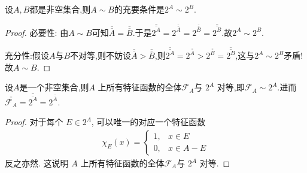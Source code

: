 \documentclass[../../main.tex]{subfiles}%
\begin{document}
\begin{proposition}\label{proposition:两集合对等的充要条件是幂集也对等}
设$A,B$都是非空集合,则$A\sim B$的充要条件是$2^A\sim 2^B$.
\end{proposition}
\begin{proof}

{\heiti 必要性:}
由$A\sim B$可知$\overline{\overline{A}}=\overline{\overline{B}}$.于是$\overline{\overline{2^A}}=2^{\overline{\overline{A}}}=2^{\overline{\overline{B}}}=\overline{\overline{2^B}}.$故$2^A\sim 2^B$.

{\heiti 充分性:}假设$A$与$B$不对等,则不妨设$\overline{\overline{A}}>\overline{\overline{B}}$,则$\overline{\overline{2^A}}=2^{\overline{\overline{A}}}>2^{\overline{\overline{B}}}=\overline{\overline{2^B}}$,这与$2^A\sim 2^B$矛盾!故$A\sim B$.
\end{proof}

\begin{lemma}\label{lemma:2^A与A上所有特征函数全体对等}
设$A$是一个非空集合,则$A$ 上所有特征函数的全体$\mathcal{F}_{A}$与 $2^A$ 对等,即$\mathcal{F}_{A}\sim 2^A$.进而$\overline{\overline{\mathcal{F}_{A}}}=\overline{\overline{2^A}}=2^{\overline{\overline{A}}}.$
\end{lemma}
\begin{proof}
对于每个 $E \in 2^A$, 可以唯一的对应一个特征函数
\begin{align*}
\chi_E(x) = 
\begin{cases}
1, & x \in E\\
0, & x \in A - E
\end{cases}
\end{align*}
反之亦然. 这说明 $A$ 上所有特征函数的全体$\mathcal{F}_{A}$与 $2^A$ 对等. 
\end{proof}
\end{document}
